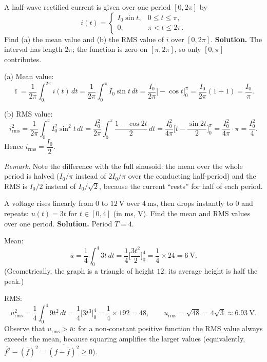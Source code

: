 \documentclass[11pt]{article}
\begin{document}
\begin{exoresolu}
A half-wave rectified current is given over one period $[0,2\pi]$ by
\[
i(t)=
\begin{cases}
I_0\sin t, & 0\le t\le \pi,\\[2pt]
0, & \pi<t\le 2\pi.
\end{cases}
\]
Find (a) the mean value and (b) the RMS value of $i$ over $[0,2\pi]$.
\tcblower
\textbf{Solution.} The interval has length $2\pi$; the function is zero on $[\pi,2\pi]$, so only $[0,\pi]$ contributes.

(a) Mean value:
\[
\bar\imath=\frac{1}{2\pi}\int_0^{2\pi} i(t)\,dt
=\frac{1}{2\pi}\int_0^{\pi} I_0\sin t\,dt
=\frac{I_0}{2\pi}\big[-\cos t\big]_0^{\pi}
=\frac{I_0}{2\pi}(1+1)=\frac{I_0}{\pi}.
\]

(b) RMS value:
\[
i_{\mathrm{rms}}^2=\frac{1}{2\pi}\int_0^{\pi} I_0^2\sin^2 t\,dt
=\frac{I_0^2}{2\pi}\int_0^{\pi}\frac{1-\cos 2t}{2}\,dt
=\frac{I_0^2}{4\pi}\Big[t-\frac{\sin 2t}{2}\Big]_0^{\pi}
=\frac{I_0^2}{4\pi}\cdot\pi=\frac{I_0^2}{4}.
\]
Hence $i_{\mathrm{rms}}=\dfrac{I_0}{2}$.

\emph{Remark.} Note the difference with the full sinusoid: the mean over the whole period is halved ($I_0/\pi$ instead of $2I_0/\pi$ over the conducting half-period) and the RMS is $I_0/2$ instead of $I_0/\sqrt2$, because the current ``rests'' for half of each period.
\end{exoresolu}

\begin{exoresolu}
A voltage rises linearly from $0$ to $12\ \mathrm{V}$ over $4\ \mathrm{ms}$, then drops instantly to $0$ and repeats: $u(t)=3t$ for $t\in[0,4]$ (in ms, V). Find the mean and RMS values over one period.
\tcblower
\textbf{Solution.} Period $T=4$.

Mean:
\[
\bar u=\frac{1}{4}\int_0^4 3t\,dt=\frac{1}{4}\Big[\frac{3t^2}{2}\Big]_0^4=\frac{1}{4}\times 24=6\ \mathrm{V}.
\]
(Geometrically, the graph is a triangle of height $12$: its average height is half the peak.)

RMS:
\[
u_{\mathrm{rms}}^2=\frac{1}{4}\int_0^4 9t^2\,dt=\frac{1}{4}\Big[3t^3\Big]_0^4=\frac{1}{4}\times 192=48,
\qquad
u_{\mathrm{rms}}=\sqrt{48}=4\sqrt{3}\approx 6.93\ \mathrm{V}.
\]
Observe that $u_{\mathrm{rms}}>\bar u$: for a non-constant positive function the RMS value always exceeds the mean, because squaring amplifies the larger values (equivalently, $\overline{f^2}-(\bar f)^2=\overline{(f-\bar f)^2}\ge 0$).
\end{exoresolu}
\end{document}

